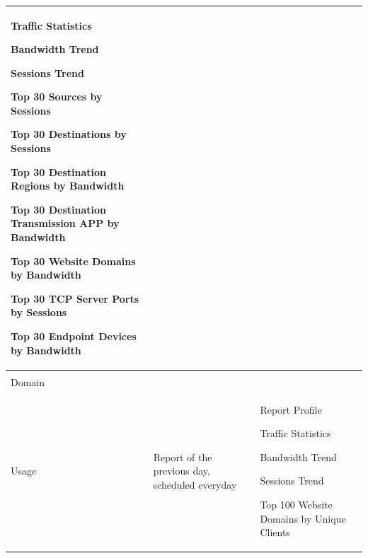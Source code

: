\begin{longtable}{p{}|p{}|p{}}
                                                                                                        Traffic Statistics


                                                                                                        Bandwidth Trend


                                                                                                        Sessions Trend 


                                                                                                        Top 30 Sources by Sessions


                                                                                                        Top 30 Destinations by Sessions


                                                                                                        Top 30 Destination Regions by Bandwidth


                                                                                                        Top 30 Destination Transmission APP by Bandwidth


                                                                                                        Top 30 Website Domains by Bandwidth


                                                                                                        Top 30 TCP Server Ports by Sessions


                                                                                                        Top 30 Endpoint Devices by Bandwidth \\\hline

    \tabincell{l}{Website\\ Domain\\ Usage} &	Report of the previous day, scheduled everyday &	Report Profile


                                                                                                    Traffic Statistics


                                                                                                    Bandwidth Trend


                                                                                                    Sessions Trend 


                                                                                                    Top 100 Website Domains by Unique Clients



\end{longtable}
